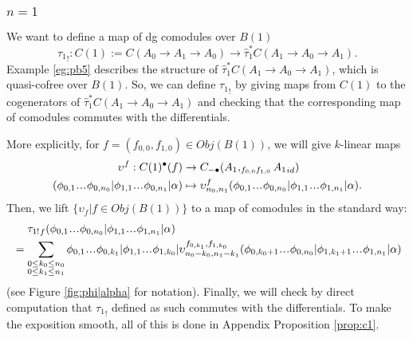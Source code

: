 \subsubsection{$n=1$}
We want to define a map of dg comodules over 
$B(1)$
$$
{\tau_1}_!: 
C(1):= C(A_0 \to A_1 \to A_0) \to 
\hat{\tau}_1^*C(A_1 \to A_0 \to A_1).
$$
Example \ref{eg:pb5} describes the structure of 
$\hat{\tau}_1^*C(A_1 \to A_0 \to A_1)$, 
which is quasi-cofree over $B(1)$.
So, we can define ${\tau_1}_!$ by 
giving maps from $C(1)$ to the cogenerators of 
$\hat{\tau}_1^*C(A_1 \to A_0 \to A_1)$ and 
checking that the corresponding map of comodules 
commutes with the differentials. 

More explicitly, 
for $f = (f_{0,0}, f_{1,0}) \in Obj(B(1))$, we will 
give $k$-linear maps
\begin{align*}
\upsilon^f: C(1)^\bullet(f) 
& \to 
C_{-\bullet}(A_1, _{f_{0,0}f_{1,0}} {A_1}_{id})\\
(\phi_{0,1}\smdots \phi_{0,n_0}|
 \phi_{1,1}\smdots \phi_{0,n_1}| \alpha )
&\mapsto
\upsilon^f_{n_0,n_1}(\phi_{0,1}\smdots \phi_{0,n_0}|
 \phi_{1,1}\smdots \phi_{1,n_1}| \alpha ).
\end{align*}
Then, we lift $\{\upsilon_f | f \in Obj(B(1))\}$ 
to a map of comodules in the standard way: 
\begin{equation}
\label{eq:colift}
\begin{split}
& \phantom{{}={}}
{\tau_{1!}}_f 
  (\phi_{0,1}\smdots \phi_{0,n_0}|
  \phi_{1,1}\smdots \phi_{1,n_1}| \alpha )\\
&= \sum \limits_{\substack{
    0 \leq k_0 \leq n_0\\
    0 \leq k_1 \leq n_1}}
\phi_{0,1}\smdots \phi_{0,k_1}|\phi_{1,1} \smdots \phi_{1,k_0}|
\upsilon^{f_{0,k_1}, f_{1,k_0}}_{n_0-k_0,n_1-k_1} 
  (\phi_{0,k_0+1}\smdots \phi_{0,n_0}|
  \phi_{1,k_1+1}\smdots \phi_{1,n_1}| \alpha )
\end{split}
\end{equation}
(see Figure \ref{fig:phi|alpha} for notation). 
Finally, we will check by direct computation that 
${\tau_1}_!$ defined as such commutes with the 
differentials. To make the exposition smooth, 
all of this is done in Appendix Proposition 
\ref{prop:c1}.

